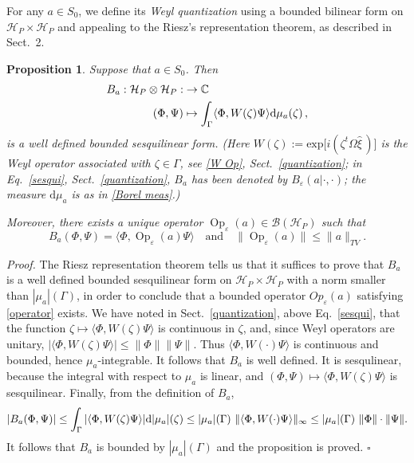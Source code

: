 \documentclass[12pt]{article}
\DeclareMathOperator{\Op}{Op}
\newcommand{\cc}{\mathbb{C}}
\renewcommand{\d}{{\rm d}}
\newtheorem{proposition}[theorem]{Proposition}
\begin{document}
For any $a\in S_0$, we define its \textit{Weyl quantization} using a bounded bilinear form on 
$\mathcal H_P \times \mathcal H_P$ and appealing to the Riesz's representation theorem, as 
described in Sect.~2.
\begin{proposition}\label{prop:def_quantization}
Suppose that $a\in S_0$. Then 
\begin{align*}
	B_a:\mathcal H_P\otimes \mathcal H_P:&\to \cc\\
	(\Phi,\Psi)&\mapsto \int_\Gamma\langle\Phi,W(\zeta)\Psi\rangle \d \mu_a(\zeta)\,,
\end{align*}
is a well defined bounded sesquilinear form. (Here $W(\zeta) :=\text{exp}\big[i(\zeta^{t}\Omega \hat{\xi}\,)\big]$ is
the Weyl operator associated with $\zeta \in \Gamma$, see \eqref{W Op}, Sect.~\ref{quantization}; in Eq.~\eqref{sesqui}, Sect.~\ref{quantization}, $B_a$ has been denoted by $B_{\varepsilon}(a |\cdot, \cdot)$; the measure $ \text{d}\mu_a$ 
is as in \eqref{Borel meas}.)

Moreover, there exists a unique operator $\Op_\varepsilon(a)\in \mathcal B(\mathcal H_P)$ such that
\begin{equation}\label{operator}
B_a(\Phi,\Psi)=\langle\Phi,\Op_{\varepsilon}(a)\Psi\rangle\quad \mbox{and}\quad \|\Op_\varepsilon(a)\|\leq \|a\|_{TV}.
\end{equation}
\end{proposition}
\textit{Proof.} The Riesz representation theorem tells us that it suffices to prove that $B_a$ is a well defined bounded sesquilinear 
form on $\mathcal H_P\times \mathcal H_P$ with a norm smaller than $|\mu_a|(\Gamma)$, in order to conclude that 
a bounded operator $Op_{\varepsilon}(a)$ satisfying \eqref{operator} exists. We have noted in Sect.~\ref{quantization}, 
above Eq.~\eqref{sesqui}, that  the function $\zeta \mapsto \langle\Phi,W(\zeta)\Psi\rangle$ is continuous in 
$\zeta$, and, since Weyl operators are unitary, $|\langle\Phi,W(\zeta)\Psi\rangle|\leq \|\Phi\|\|\Psi\|$. 
Thus $\langle\Phi,W(\cdot)\Psi\rangle$ is continuous and bounded,
hence $\mu_a$-integrable. It follows that $B_a$ is well defined. It is sesqulinear, because the integral with respect 
to $\mu_a$ is linear, and $(\Phi,\Psi)\mapsto \langle\Phi,W(\zeta)\Psi\rangle$ is sesquilinear. 
Finally, from the definition of $B_a$,
$$|B_a(\Phi,\Psi)|\leq\int_\Gamma|\langle\Phi,W(\zeta)\Psi\rangle|\d|\mu_a|(\zeta)\leq |\mu_a|(\Gamma)\  \|\langle\Phi,W(\cdot)\Psi\rangle\|_\infty\leq |\mu_a|(\Gamma)\ \|\Phi\| \cdot \|\Psi\|.$$
It follows that $B_a$ is bounded by $|\mu_a|(\Gamma)$ and the proposition is proved.  \hfill{$\square$}
\end{document}
